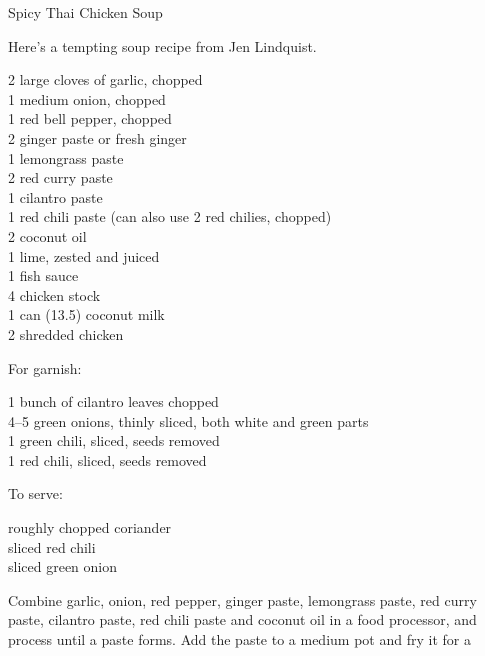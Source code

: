 
\begin{entry}{Spicy Thai Chicken Soup}

\begin{open}
    Here's a tempting soup recipe from Jen Lindquist.
\end{open}
\begin{ingredients}
    2 large cloves of garlic, chopped\\
    1 medium onion, chopped\\
    1 red bell pepper, chopped\\
    \SI{2}{\tblspoon} ginger paste or fresh ginger\\
    \SI{1}{\tblspoon} lemongrass paste\\
    \SI{2}{\tblspoon} red curry paste\\
    \SI{1}{\tblspoon} cilantro paste\\
    \SI{1}{\tblspoon} red chili paste (can also use 2 red chilies, chopped)\\
    \SI{2}{\tblspoon} coconut oil\\
    1 lime, zested and juiced\\
    \SI{1}{\tblspoon} fish sauce\\
    \SI{4}{\cup} chicken stock\\
    1 can (\SI{13.5}{\fluidounce}) coconut milk\\
    \SI{2}{\cup} shredded chicken
\end{ingredients}
For garnish:
\begin{ingredients}
    1 bunch of cilantro leaves chopped\\
    \numrange{4}{5} green onions, thinly sliced, both white and green parts\\
    1 green chili, sliced, seeds removed\\
    1 red chili, sliced, seeds removed
\end{ingredients}
To serve:
\begin{ingredients}
    roughly chopped coriander\\
    sliced red chili\\
    sliced green onion
\end{ingredients}
Combine garlic, onion, red pepper, ginger paste, lemongrass paste, red curry
paste, cilantro paste, red chili paste and coconut oil in a food processor, and
process until a paste forms. Add the paste to a medium pot and fry it for a

\end{entry}

